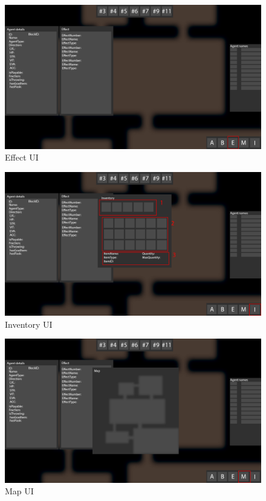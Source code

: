 \begin{figure}[!ht]
	\centering
	\includegraphics[scale=0.2]{images/uiagenteffect.png}
	\caption{Effect UI}
	\label{fig:effectui}
\end{figure}

\begin{figure}[!ht]
	\centering
	\includegraphics[scale=0.2]{images/uiinventory.png}
	\caption{Inventory UI}
	\label{fig:invui}
\end{figure}

\begin{figure}[!ht]
	\centering
	\includegraphics[scale=0.2]{images/uimap.png}
	\caption{Map UI}
	\label{fig:mapui}
\end{figure}

